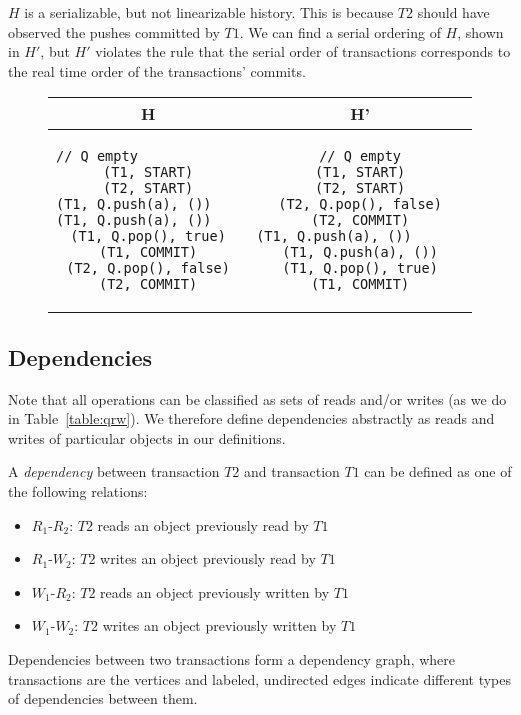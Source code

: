\begin{eg}
$H$ is a serializable, but not linearizable history. This is because $T2$ should have observed the pushes committed by $T1$. We can find a serial ordering of $H$, shown in $H'$, but $H'$ violates the rule that the serial order of transactions corresponds to the real time order of the transactions' commits.
    
\begin{figure}[H]
    \centering
\singlespacing   
    \begin{tabular}{c|c}
H & H'\\
\hline
\begin{lstlisting}
// Q empty                          
(T1, START)
(T2, START)
(T1, Q.push(a), ())                
(T1, Q.push(a), ())               
(T1, Q.pop(), true)
(T1, COMMIT)
(T2, Q.pop(), false)
(T2, COMMIT)
\end{lstlisting} & 
\begin{lstlisting}
// Q empty
(T1, START)
(T2, START)
(T2, Q.pop(), false)
(T2, COMMIT)
(T1, Q.push(a), ())                       
(T1, Q.push(a), ())
(T1, Q.pop(), true)
(T1, COMMIT)
\end{lstlisting}
    \end{tabular}
\end{figure}
\end{eg}

\subsection{Dependencies}

Note that all operations can be classified as sets of reads and/or writes (as we do in Table~\ref{table:qrw}). We therefore define dependencies abstractly as reads and writes of particular objects in our definitions.

\begin{defn}
    A \emph{dependency} between transaction $T2$ and transaction $T1$ can be defined as one of the following relations:
    \begin{itemize}
        \item $R_1$-$R_2$: $T2$ reads an object previously read by $T1$
        \item $R_1$-$W_2$: $T2$ writes an object previously read by $T1$
        \item $W_1$-$R_2$: $T2$ reads an object previously written by $T1$
        \item $W_1$-$W_2$: $T2$ writes an object previously written by $T1$
    \end{itemize}
    Dependencies between two transactions form a dependency graph, where transactions are the vertices and labeled, undirected edges indicate different types of dependencies between them.
\end{defn}

